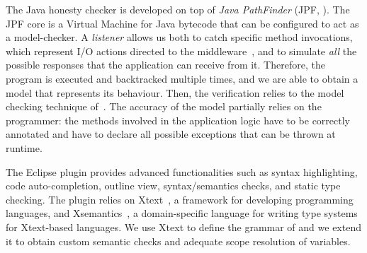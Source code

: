 The Java honesty checker is developed on top of \emph{Java PathFinder}
(JPF, \cite{lerda2001addressing,visser2003model}).
The JPF core is a Virtual Machine for Java bytecode
that can be configured to act as a model-checker.
%
A \emph{listener} allows us both to catch specific method invocations, 
which represent I/O actions
directed to the middleware~\cite{CO2middleware},
and to simulate \emph{all} the possible responses that 
the application can receive from it.
%
%
Therefore, the program is executed and backtracked multiple times,
and we are able to obtain a \coco model that represents its behaviour.
Then, the verification relies to the model checking technique of~\cite{BMSZ15jlamp}.
%
The accuracy of the model partially relies on the programmer:
the methods involved in the application logic have to be correctly annotated
and have to declare all possible exceptions that can be thrown at runtime.

The Eclipse plugin provides advanced functionalities such as
syntax highlighting, 
code auto-completion, 
outline view,
syntax/semantics checks,
and static type checking.
%
The plugin relies on
Xtext~\cite{xtext-site}, a framework for developing programming languages, 
and Xsemantics~\cite{xsemantics-site}, a domain-specific language for writing type systems
for Xtext-based languages.
%
We use Xtext to define the grammar of \coco
and we extend it to obtain custom semantic checks and adequate scope resolution of variables.

